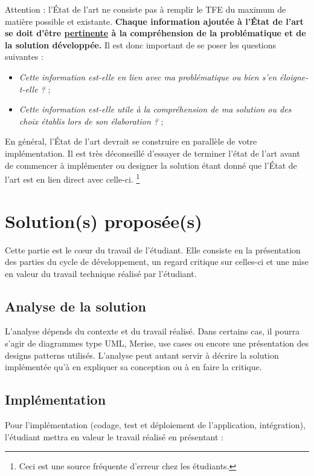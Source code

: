 \documentclass{HELBreport}
\begin{document}
Attention : l'État de l'art ne consiste pas à remplir le TFE du maximum de matière possible et existante. \textbf{Chaque information ajoutée à l'État de l'art se doit d'être  \underline{pertinente} à la compréhension de la problématique et de la solution développée.} Il est donc important de se poser les questions suivantes : 

\begin{itemize}
    \item \textit{Cette information est-elle en lien avec ma problématique ou bien s'en éloigne-t-elle ?} ;
    \item \textit{Cette information est-elle utile à la compréhension de ma solution ou des choix établis lors de son élaboration ?} ;
\end{itemize} 

En général, l'État de l'art devrait se construire en parallèle de votre implémentation. Il est très déconseillé d'essayer de terminer l'état de l'art avant de commencer à implémenter ou designer la solution étant donné que l'État de l'art est en lien direct avec celle-ci. \footnote{Ceci est une source fréquente d'erreur chez les étudiants.}   

\chapter{Solution(s) proposée(s)}

Cette partie est le cœur du travail de l’étudiant. Elle consiste en la présentation des parties du cycle de développement, un regard critique sur celles-ci et une mise en valeur du travail technique réalisé par l’étudiant. 

\section{Analyse de la solution}

L'analyse dépends du contexte et du travail réalisé. Dans certains cas, il pourra s'agir de diagrammes type UML, Merise, use cases ou encore une présentation des designs patterns utilisés. L'analyse peut autant servir à décrire la solution implémentée qu'à en expliquer sa conception ou à en faire la critique.

\section{Implémentation}

Pour l’implémentation (codage, test et déploiement de l’application, intégration), l’étudiant mettra en valeur le travail réalisé en présentant :
\end{document}
